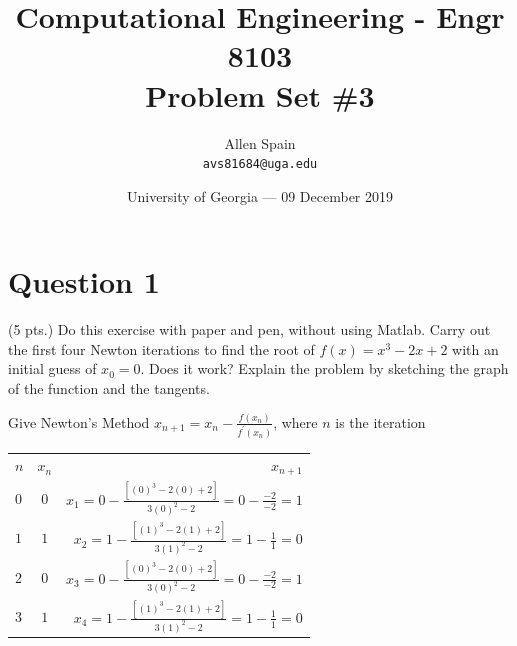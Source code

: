 \documentclass{article}
\title{Computational Engineering - Engr 8103 \\ Problem Set \#3} %
\author{Allen Spain\\ \texttt{avs81684@uga.edu}} %
\date{University of Georgia --- 09 December 2019 } %
\begin{document}
\maketitle %


\section*{Question 1} %
(5 pts.) Do this exercise with paper and pen, without using Matlab. Carry out the first four Newton iterations to find the root of $f(x) = x^{3} - 2x + 2$ with an initial guess of $x_{0} = 0$. Does it work? Explain the problem by sketching the graph of the function and the tangents.

\noindent
Give Newton's Method $x_{n+1} = x_{n} - \frac{f(x_{n})}{f^{\prime}(x_{n})}$, where $n$ is the iteration

\begin{tabular} {l | c |  r}
  $ n $ & $x_{n}$ & $x_{n+1}$\\
  $ 0 $& $ 0 $ & $x_{1} =  0 - \frac{[(0)^3 - 2(0) + 2]}{3(0)^{2} - 2} = 0 - \frac{-2}{-2} = 1$\\
  $ 1 $ & $ 1 $ & $x_{2} =  1 - \frac{[(1)^3 - 2(1) + 2]}{3(1)^{2} - 2} = 1 - \frac{1}{1} = 0$\\
  $ 2 $ & $ 0 $ & $x_{3} =  0 - \frac{[(0)^3 - 2(0) + 2]}{3(0)^{2} - 2} = 0 - \frac{-2}{-2} = 1$\\
  $ 3 $ & $ 1 $ & $x_{4} =  1 - \frac{[(1)^3 - 2(1) + 2]}{3(1)^{2} - 2} = 1 - \frac{1}{1} = 0$
\end{tabular}\\
\end{document}
